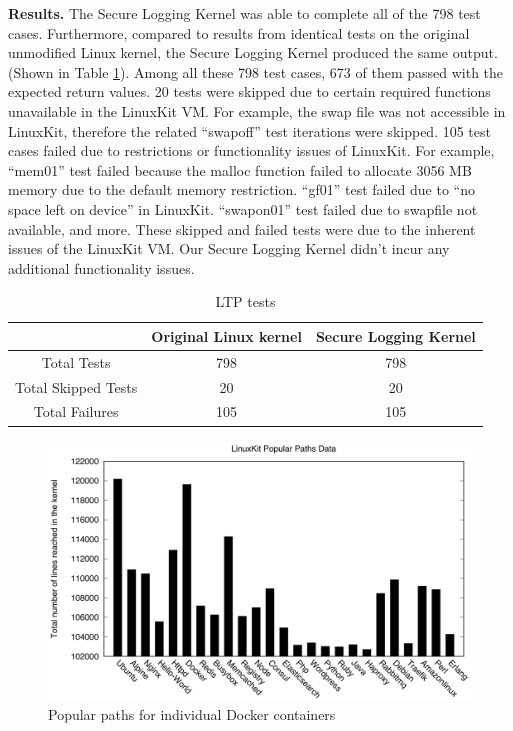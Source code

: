 \textbf{Results.}
The Secure Logging Kernel was able to complete all of the 798 test cases. 
Furthermore, compared to results from identical tests on the original unmodified Linux kernel, the Secure Logging Kernel produced the same output. (Shown in Table \ref{tab:evaluation_ltp_results}).  
Among all these 798 test cases, 673 of them passed with the expected return values. 20 tests were skipped due to certain required functions unavailable in the LinuxKit VM. 
For example, the swap file was not accessible in LinuxKit, therefore the related ``swapoff'' test iterations were skipped. 
105 test cases failed due to restrictions or functionality issues of LinuxKit. 
For example, ``mem01'' test failed because the malloc function failed to allocate 3056 MB memory due to the default memory restriction. 
``gf01'' test failed due to ``no space left on device'' in LinuxKit. ``swapon01'' test failed due to swapfile not available, and more. 
These skipped and failed tests were due to the inherent issues of the LinuxKit VM. Our Secure Logging Kernel didn't incur any additional functionality issues.  

\begin{table}[h!]
\begin{center}
\caption{LTP tests}
\label{tab:evaluation_ltp_results}
\begin{tabular}{c|c|c}
 & Original Linux kernel & Secure Logging Kernel \\
 \hline
 Total Tests & 798 & 798 \\
 \hline
 Total Skipped Tests & 20 & 20 \\
 \hline
 Total Failures & 105 & 105 \\ 
\end{tabular}
\end{center}
\end{table}

\begin{figure}
\centering
\includegraphics[width=1.5\columnwidth]{diagram/pp-individuals.png}
\caption{\small Popular paths for individual Docker containers}
\label{fig:pp-individuals}
\end{figure}

